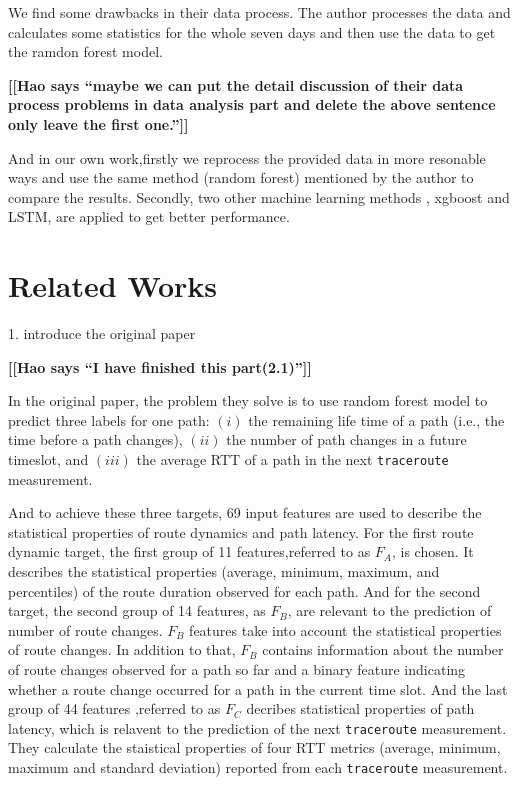 \documentclass[sigconf]{acmart}
\newcommand{\hao}[1]{{\bf \color{red} [[Hao says ``#1'']]}}
\begin{document}
	We find some drawbacks in their data process.
	The author processes the data and calculates some statistics for the whole seven days and then use the data to get the ramdon forest model.
	
	\hao{maybe we can put the detail discussion of their data process problems in data analysis part and delete the above sentence only leave the first one.}
	
	And in our own work,firstly we reprocess the provided data in more resonable ways and use the same method (random forest) mentioned by the author to compare the results. Secondly, two other machine learning methods , xgboost and LSTM, are applied to get better performance.
	
	\section{Related Works}
	1. introduce the original paper
	
	\hao{I have finished this part(2.1)}
	
	In the original paper, the problem they solve is to use random forest model to predict three labels for one path: $(i)$ the remaining life time of a path (i.e., the time before a path changes), $(ii)$ the number of path changes in a future timeslot, and $(iii)$ the average RTT of a path in the next \texttt{traceroute} measurement.
	
	And to achieve these three targets, 69 input features are used to describe the  statistical properties of route dynamics and path latency.
	For the first route dynamic target, the first group of 11 features,referred to as $F_A$, is chosen. It describes the statistical properties (average, minimum, maximum, and percentiles) of the route duration observed for each path.
	And for the second target, the second group of 14 features, as $F_B$, are relevant to the prediction of number of route changes. $F_B$ features take into account the statistical properties of route changes. In addition to that, $F_B$ contains information about the number of route changes observed for a path so far and a binary feature indicating whether a route change occurred for a path in the current time slot. 
	And the last group of 44 features ,referred to as $F_C$ decribes statistical properties of path latency, which is relavent to the prediction of the next \texttt{traceroute} measurement. They calculate the staistical properties of four RTT metrics (average, minimum, maximum and standard deviation) reported from each \texttt{traceroute} measurement.
	
\end{document}
